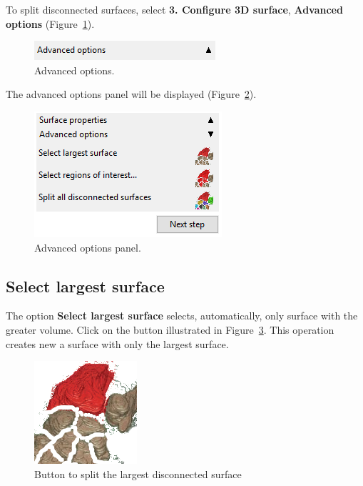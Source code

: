 To split disconnected surfaces, select \textbf{3. Configure 3D surface}, \textbf{Advanced options} (Figure~\ref{fig:advanced_tools}).

\begin{figure}[!htb]
\centering
\includegraphics[scale=0.7]{../user_guide_figures/invesalius_screen/surface_painel_advanced_options_en.png}
\caption{Advanced options.}
\label{fig:advanced_tools}
\end{figure}

\newpage

The advanced options panel will be displayed (Figure~\ref{fig:advanced_tools_expanded}).

\begin{figure}[!htb]
\centering
\includegraphics[scale=0.7]{../user_guide_figures/invesalius_screen/surface_split_en.png}
\caption{Advanced options panel.}
\label{fig:advanced_tools_expanded}
\end{figure}

\subsection{Select largest surface}

The option \textbf{Select largest surface} selects, automatically, only surface with the greater volume. Click on the button illustrated in Figure~\ref{fig:short_connectivity_largest}. This operation creates new a surface with only the largest surface.


\begin{figure}[!htb]
\centering
\includegraphics[scale=0.2]{../user_guide_figures/icons/connectivity_largest.png}
\caption{Button to split the largest disconnected surface}
\label{fig:short_connectivity_largest}
\end{figure}

